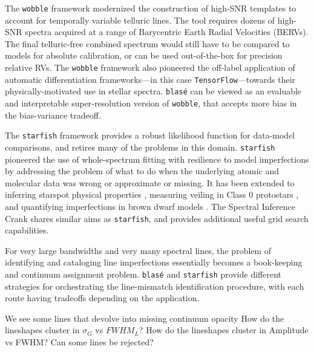 \documentclass[modern]{aastex631}
\begin{document}
The \texttt{wobble} framework \citep{2019AJ....158..164B} modernized the construction of high-SNR templates to account for temporally variable telluric lines. The tool requires dozens of high-SNR spectra acquired at a range of Barycentric Earth Radial Velocities (BERVs).  The final telluric-free combined spectrum would still have to be compared to models for absolute calibration, or can be used out-of-the-box for precision relative RVs.  The \texttt{wobble} framework also pioneered the off-label application of automatic differentiation frameworks---in this case \texttt{TensorFlow}---towards their physically-motivated use in stellar spectra.  \texttt{blas\'e} can be viewed as an evaluable and interpretable super-resolution version of \texttt{wobble}, that accepts more bias in the bias-variance tradeoff.

The \texttt{starfish} framework \citep{czekala15} provides a robust likelihood function for data-model comparisons, and retires many of the problems in this domain.  \texttt{starfish} pioneered the use of whole-spectrum fitting with resilience to model imperfections by addressing the problem of what to do when the underlying atomic and molecular data was wrong or approximate or missing.  It has been extended to inferring starspot physical properties \citep{2017ApJ...836..200G}, measuring veiling in Class 0 protostars \citep{2018ApJ...862...85G}, and quantifying imperfections in brown dwarf models \citep{2021ApJ...921...95Z}.  The Spectral Inference Crank \citep[\texttt{sick},][]{2016ApJS..223....8C} shares similar aims as \texttt{starfish}, and provides additional useful grid search capabilities.

For very large bandwidths and very many spectral lines, the problem of identifying and cataloging line imperfections essentially becomes a book-keeping and continuum assignment problem.  \texttt{blas\'e} and \texttt{starfish} provide different strategies for orchestrating the line-mismatch identification procedure, with each route having tradeoffs depending on the application.

\begin{outline}
    \1 We see some lines that devolve into missing continuum opacity
    \1 How do the lineshapes cluster in $\sigma_G$ vs $FWHM_L$?
    \1 How do the lineshapes cluster in Amplitude vs FWHM? Can some lines be rejected?
\end{outline}
\end{document}

